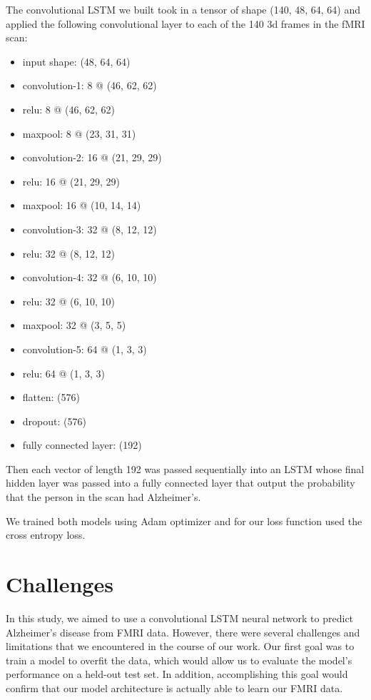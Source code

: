 \documentclass[10pt]{article}
\begin{document}
	The convolutional LSTM we built took in a tensor of shape 
	(140, 48, 64, 64) and applied the following convolutional layer to each of the 140 3d frames in the fMRI scan:
		\begin{itemize}
			\item input shape: (48, 64, 64)
			\item convolution-1: 8 @ (46, 62, 62)
			\item relu: 8 @ (46, 62, 62)
			\item maxpool: 8 @ (23, 31, 31)
			\item convolution-2: 16 @ (21, 29, 29)
			\item relu: 16 @ (21, 29, 29)
			\item maxpool: 16 @ (10, 14, 14)
			\item convolution-3: 32 @ (8, 12, 12)
			\item relu: 32 @ (8, 12, 12)
			\item convolution-4: 32 @ (6, 10, 10)
			\item relu: 32 @ (6, 10, 10)
			\item maxpool: 32 @ (3, 5, 5)
			\item convolution-5: 64 @ (1, 3, 3)
			\item relu: 64 @ (1, 3, 3)
			\item flatten: (576)
			\item dropout: (576)
			\item fully connected layer: (192)
	\end{itemize}

	Then each vector of length 192 was passed sequentially into an LSTM whose final hidden layer was passed into a fully connected layer that output the probability that the person in the scan had Alzheimer's.

	We trained both models using Adam optimizer and for our loss function used the cross entropy loss. 


	\section{Challenges}
	\label{sec:challenges}

	In this study, we aimed to use a convolutional LSTM neural network to predict Alzheimer's disease from FMRI data. However, there were several challenges and limitations that we encountered in the course of our work. Our first goal was to train a model to overfit the data, which would allow us to evaluate the model's performance on a held-out test set. In addition, accomplishing this goal would confirm that our model architecture is actually able to learn our FMRI data.
\end{document}
